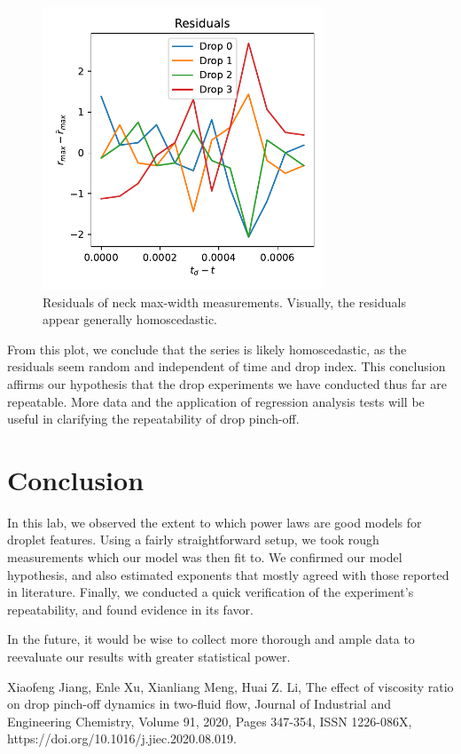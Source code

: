 \documentclass[12pt, letterpaper]{article}
\begin{document}
\begin{figure}[!h]
    \centering
    \includegraphics[width=0.75\textwidth]{experiment3/figures/plots/7res.pdf}
    \caption{Residuals of neck max-width measurements. Visually, the residuals appear generally homoscedastic.}
    \label{fig:repeatability-residuals}
\end{figure}

From this plot, we conclude that the series is likely homoscedastic, as the residuals seem random and independent of time and drop index. This conclusion affirms our hypothesis that the drop experiments we have conducted thus far are repeatable. More data and the application of regression analysis tests will be useful in clarifying the repeatability of drop pinch-off. 

\section{Conclusion}

In this lab, we observed the extent to which power laws are good models for droplet features. Using a fairly straightforward setup, we took rough measurements which our model was then fit to. We confirmed our model hypothesis, and also estimated exponents that mostly agreed with those reported in literature. Finally, we conducted a quick verification of the experiment's repeatability, and found evidence in its favor. 

In the future, it would be wise to collect more thorough and ample data to reevaluate our results with greater statistical power. 

\begin{thebibliography}{!h}
    Xiaofeng Jiang, Enle Xu, Xianliang Meng, Huai Z. Li, The effect of viscosity ratio on drop pinch-off dynamics in two-fluid flow, Journal of Industrial and Engineering Chemistry, Volume 91, 2020, Pages 347-354, ISSN 1226-086X, https://doi.org/10.1016/j.jiec.2020.08.019.
\end{thebibliography}
\end{document}
